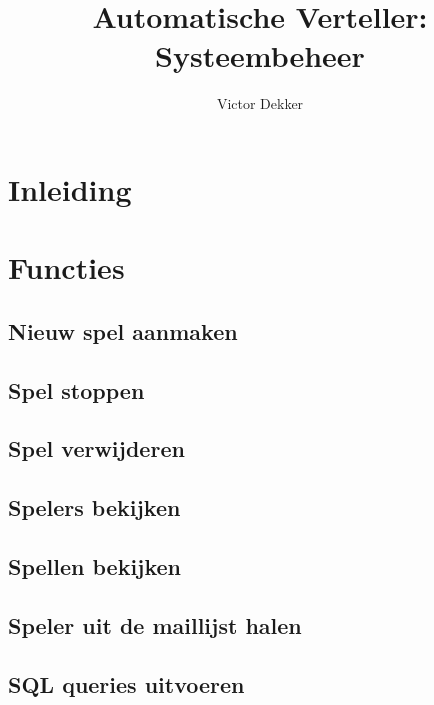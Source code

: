 \documentclass[12pt]{article}
\author{Victor Dekker}
\title{Automatische Verteller:\\Systeembeheer}
\begin{document}

\maketitle

\tableofcontents
\newpage

\section{Inleiding}

\section{Functies}

  \subsection{Nieuw spel aanmaken}
  
  \subsection{Spel stoppen}
  
  \subsection{Spel verwijderen}
  
  \subsection{Spelers bekijken}
  
  \subsection{Spellen bekijken}
  
  \subsection{Speler uit de maillijst halen}
  
  \subsection{SQL queries uitvoeren}
\end{document}
